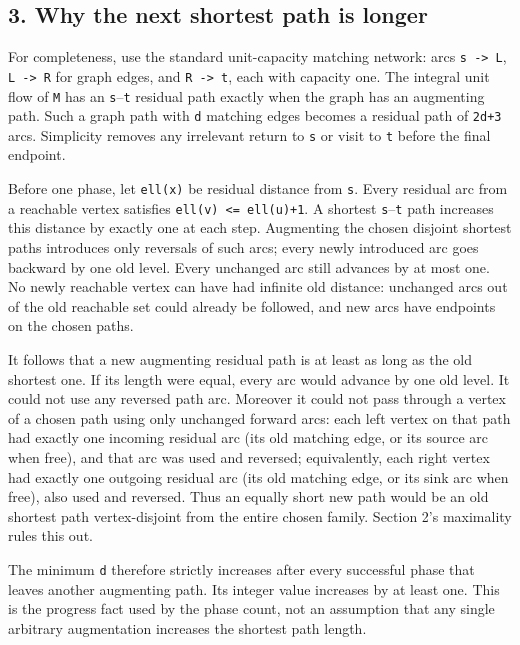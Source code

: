 \hypertarget{af-4c656876fd-why-the-next-shortest-path-is-longer}{%
\subsection{3. Why the next shortest path is longer}\label{af-4c656876fd-why-the-next-shortest-path-is-longer}}

For completeness, use the standard unit-capacity matching network: arcs \texttt{s\ -\textgreater{}\ L}, \texttt{L\ -\textgreater{}\ R} for graph edges, and \texttt{R\ -\textgreater{}\ t}, each with capacity one. The integral unit flow of \texttt{M} has an \texttt{s}--\texttt{t} residual path exactly when the graph has an augmenting path. Such a graph path with \texttt{d} matching edges becomes a residual path of \texttt{2d+3} arcs. Simplicity removes any irrelevant return to \texttt{s} or visit to \texttt{t} before the final endpoint.

Before one phase, let \texttt{ell(x)} be residual distance from \texttt{s}. Every residual arc from a reachable vertex satisfies \texttt{ell(v)\ \textless{}=\ ell(u)+1}. A shortest \texttt{s}--\texttt{t} path increases this distance by exactly one at each step. Augmenting the chosen disjoint shortest paths introduces only reversals of such arcs; every newly introduced arc goes backward by one old level. Every unchanged arc still advances by at most one. No newly reachable vertex can have had infinite old distance: unchanged arcs out of the old reachable set could already be followed, and new arcs have endpoints on the chosen paths.

It follows that a new augmenting residual path is at least as long as the old shortest one. If its length were equal, every arc would advance by one old level. It could not use any reversed path arc. Moreover it could not pass through a vertex of a chosen path using only unchanged forward arcs: each left vertex on that path had exactly one incoming residual arc (its old matching edge, or its source arc when free), and that arc was used and reversed; equivalently, each right vertex had exactly one outgoing residual arc (its old matching edge, or its sink arc when free), also used and reversed. Thus an equally short new path would be an old shortest path vertex-disjoint from the entire chosen family. Section 2's maximality rules this out.

The minimum \texttt{d} therefore strictly increases after every successful phase that leaves another augmenting path. Its integer value increases by at least one. This is the progress fact used by the phase count, not an assumption that any single arbitrary augmentation increases the shortest path length.

